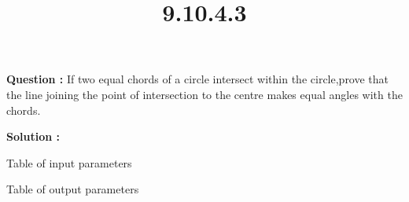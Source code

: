 \documentclass[12pt]{article}
\begin{document}
\title{\textbf{9.10.4.3}}
\date{}
\maketitle
\textbf{Question :} If two equal chords of a circle intersect within the circle,prove that the line joining the point of intersection to the centre makes equal angles with the chords.

\textbf{Solution :}

\begin{table}[H]
    \centering
    
    \caption{Table of input parameters}
    \label{tab:tab:9.10.4.3.1}
\end{table}

\begin{table}[H]
    \centering

\caption{Table of output parameters}
    \label{tab:tab:9.10.4.3.2}
\end{table}
\end{document}
